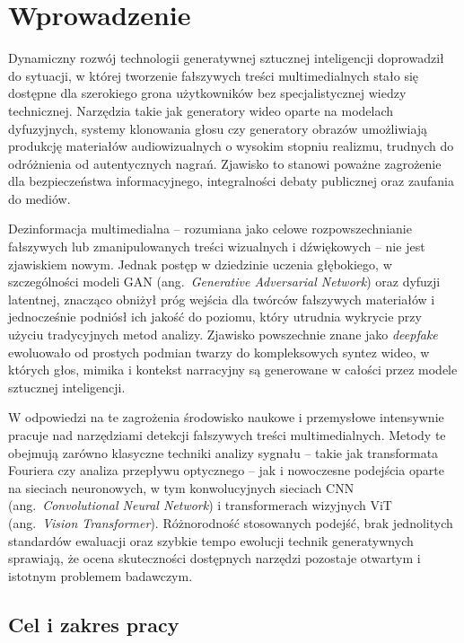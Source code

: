 \chapter{Wprowadzenie}

Dynamiczny rozwój technologii generatywnej sztucznej inteligencji doprowadził do sytuacji, w której tworzenie fałszywych treści multimedialnych stało się dostępne dla szerokiego grona użytkowników bez specjalistycznej wiedzy technicznej.
Narzędzia takie jak generatory wideo oparte na modelach dyfuzyjnych, systemy klonowania głosu czy generatory obrazów umożliwiają produkcję materiałów audiowizualnych o wysokim stopniu realizmu, trudnych do odróżnienia od autentycznych nagrań.
Zjawisko to stanowi poważne zagrożenie dla bezpieczeństwa informacyjnego, integralności debaty publicznej oraz zaufania do mediów.

Dezinformacja multimedialna -- rozumiana jako celowe rozpowszechnianie fałszywych lub zmanipulowanych treści wizualnych i dźwiękowych -- nie jest zjawiskiem nowym.
Jednak postęp w dziedzinie uczenia głębokiego, w szczególności modeli GAN (ang.~\textit{Generative Adversarial Network}) oraz dyfuzji latentnej, znacząco obniżył próg wejścia dla twórców fałszywych materiałów i jednocześnie podniósł ich jakość do poziomu, który utrudnia wykrycie przy użyciu tradycyjnych metod analizy.
Zjawisko powszechnie znane jako \textit{deepfake} ewoluowało od prostych podmian twarzy do kompleksowych syntez wideo, w których głos, mimika i kontekst narracyjny są generowane w całości przez modele sztucznej inteligencji.

W odpowiedzi na te zagrożenia środowisko naukowe i przemysłowe intensywnie pracuje nad narzędziami detekcji fałszywych treści multimedialnych.
Metody te obejmują zarówno klasyczne techniki analizy sygnału -- takie jak transformata Fouriera czy analiza przepływu optycznego -- jak i nowoczesne podejścia oparte na sieciach neuronowych, w tym konwolucyjnych sieciach CNN (ang.~\textit{Convolutional Neural Network}) i transformerach wizyjnych ViT (ang.~\textit{Vision Transformer}).
Różnorodność stosowanych podejść, brak jednolitych standardów ewaluacji oraz szybkie tempo ewolucji technik generatywnych sprawiają, że ocena skuteczności dostępnych narzędzi pozostaje otwartym i istotnym problemem badawczym.

\section*{Cel i zakres pracy}

